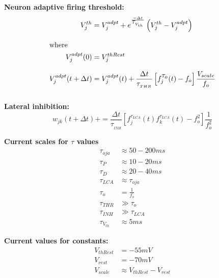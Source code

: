 \documentclass{article}
\def\fterm#1#2{f_{#1}^{\displaystyle{\tau_{#2}}}}
\begin{document}

{\bf Neuron adaptive firing threshold:}
\begin{align}
        V^{th}_{j} &= V^{adpt}_{j} +
        e^{\frac{-\Delta t}{\displaystyle{\tau}_{_{V_{th}}}}} \left(V^{th}_{j} - V^{adpt}_{j}\right)
        \label{Vth}\\[3mm]
\intertext{where}
        V^{adpt}_{j}(0) &= V^{thRest}_{j}\nonumber
        \label{dynVthRestInit}\\[3mm]
        V^{adpt}_{j}(t+\Delta t) &= V^{adpt}_{j}(t) + \frac{\Delta t}{\displaystyle{\tau}_{_{THR}}}
        \left[\fterm{j}{o}(t) - f_o\right]
        \frac{V_{scale}}{f_o}\nonumber
        \label{dynVthRest}\\[3mm]
\end{align}


{\bf Lateral inhibition:}
\begin{equation}\label{lateralInhib}
w_{jk}(t+\Delta t) += \frac{\Delta t}{\displaystyle{\tau}_{_{INH}}} \left[\fterm{j}{LCA}(t)\fterm{k}{LCA}(t) - f_{o}^{2} \right] \frac{1}{f_{o}^{2}}
\end{equation}

{\bf Current scales for $\tau$ values}
\begin{align}
\displaystyle{\tau}_{oja} &\approx 50-200 ms\nonumber\\[2mm]
\displaystyle{\tau}_{P} &\approx 10-20 ms\nonumber\\[2mm]
\displaystyle{\tau}_{D} &\approx 20-40 ms\nonumber\\[2mm]
\displaystyle{\tau}_{LCA} &\approx \displaystyle{\tau}_{oja}\nonumber\\[2mm]
\displaystyle{\tau}_{o} &= \frac{1}{f_o}\nonumber\\[2mm]
\displaystyle{\tau}_{THR} &\gg \displaystyle{\tau}_{o}\nonumber\\[2mm]
\displaystyle{\tau}_{INH} &\gg \displaystyle{\tau}_{LCA}\nonumber\\[2mm]
\displaystyle{\tau}_{V_{th}} &\approx 5ms\nonumber
\end{align}

{\bf Current values for constants:}
\begin{align}
V_{thRest} &= -55 mV\nonumber\\[2mm]
V_{rest} &= -70 mV\nonumber\\[2mm]
V_{scale} &\approx V_{thRest} - V_{rest}\nonumber
\end{align}
\end{document}
